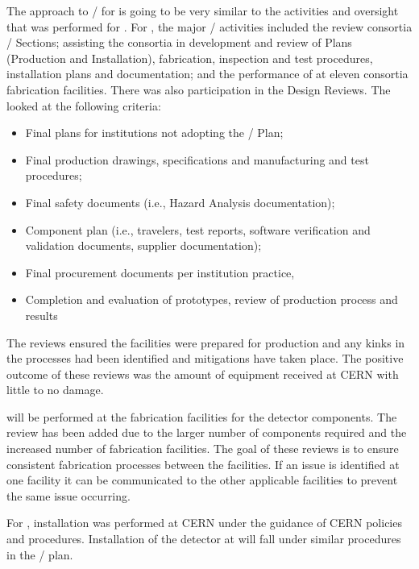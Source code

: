 The approach to / for  is going to be very
similar to the activities and oversight that was performed for
.  For , the major /
activities included the review consortia  /
Sections; assisting the consortia in development and review of 
Plans (Production and Installation), fabrication, inspection and test
procedures, installation plans and documentation; and the performance
of  at eleven consortia fabrication facilities.  There was
also  participation in the  Design Reviews.
The  looked at the following criteria:
\begin{itemize}
  \item Final  plans for institutions not adopting the
    /  Plan;
  \item Final production drawings, specifications and manufacturing
    and test procedures;
  \item Final safety documents (i.e., Hazard Analysis documentation);
  \item Component  plan (i.e., travelers, test reports, software
    verification and validation documents, supplier documentation);
  \item Final procurement documents per institution practice,
  \item Completion and evaluation of prototypes, review of production
    process and  results
\end{itemize}
The reviews ensured the facilities were prepared for production and
any kinks in the processes had been identified and mitigations have
taken place. The positive outcome of these reviews was the amount of
equipment received at CERN with little to no damage.

 will be performed at the fabrication facilities for the
 detector components. The review has been added due to the
larger number of components required and the increased number of
fabrication facilities. The goal of these reviews is to ensure
consistent fabrication processes between the facilities. If an issue
is identified at one facility it can be communicated to the other
applicable facilities to prevent the same issue occurring.

For , installation was performed at CERN under the
guidance of CERN policies and procedures. Installation of the
 detector at \surf will fall under similar procedures in the
/  plan.
